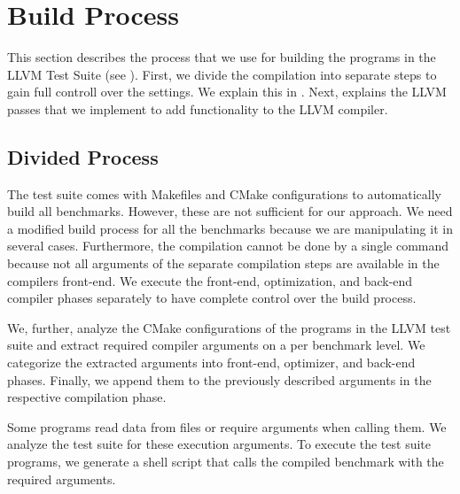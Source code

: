 \section{Build Process}
\label{sec:approach:build_process}
This section describes the process that we use for building the programs in the LLVM Test Suite (see ).
First, we divide the compilation into separate steps to gain full controll over the settings.
We explain this in .
Next,  explains the LLVM passes that we implement to add functionality to the LLVM compiler.

\subsection{Divided Process}
\label{sec:approach:divided-build}
The test suite comes with Makefiles and CMake configurations to automatically build all benchmarks.
However, these are not sufficient for our approach.
We need a modified build process for all the benchmarks because we are manipulating it in several cases.
Furthermore, the compilation cannot be done by a single command because not all arguments of the separate compilation steps are available in the compilers front-end.
We execute the front-end, optimization, and back-end compiler phases separately to have complete control over the build process.

We, further, analyze the CMake configurations of the programs in the LLVM test suite and extract required compiler arguments on a per benchmark level.
We categorize the extracted arguments into front-end, optimizer, and back-end phases.
Finally, we append them to the previously described arguments in the respective compilation phase.

Some programs read data from files or require arguments when calling them.
We analyze the test suite for these execution arguments.
To execute the test suite programs, we generate a shell script that calls the compiled benchmark with the required arguments.

